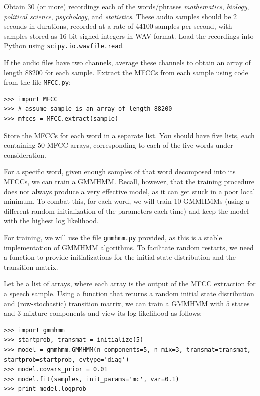 \begin{problem}
Obtain $30$ (or more) recordings each of the words/phrases \emph{mathematics}, \emph{biology}, \emph{political science}, \emph{psychology}, and \emph{statistics}.
These audio samples should be 2 seconds in durations, recorded at a rate of 44100 samples per second, with samples stored as 16-bit signed integers in WAV format.
Load the recordings into Python using {\tt scipy.io.wavfile.read}.

If the audio files have two channels, average these channels to obtain an array of length $88200$ for each sample.
Extract the MFCCs from each sample using code from the file {\tt MFCC.py}:
\begin{lstlisting}
>>> import MFCC
>>> # assume sample is an array of length 88200
>>> mfccs = MFCC.extract(sample)
\end{lstlisting}
Store the MFCCs for each word in a separate list. You should have five lists, each containing 50 MFCC arrays, corresponding to each of the five words
under consideration.
\end{problem}

For a specific word, given enough samples of that word decomposed into its MFCCs, we can train a GMMHMM.
Recall, however, that the training procedure does not always produce a very effective model, as it can get stuck in a poor local minimum.
To combat this, for each word, we will train 10 GMMHMMs (using a different random initialization of the parameters each time)
and keep the model with the highest log likelihood.

For training, we will use the file {\tt gmmhmm.py} provided, as this is a stable implementation of GMMHMM algorithms.
To facilitate random restarts, we need a function to provide initializations for the initial state distribution and the transition matrix.

Let  be a list of arrays, where each array is the output of the MFCC extraction for a speech sample.
Using a function  that returns a random initial state distribution and (row-stochastic) transition matrix, we can train a GMMHMM with $5$ states
and $3$ mixture components and view its log likelihood as follows:
\begin{lstlisting}
>>> import gmmhmm
>>> startprob, transmat = initialize(5)
>>> model = gmmhmm.GMMHMM(n_components=5, n_mix=3, transmat=transmat, startprob=startprob, cvtype='diag')
>>> model.covars_prior = 0.01
>>> model.fit(samples, init_params='mc', var=0.1)
>>> print model.logprob
\end{lstlisting}

